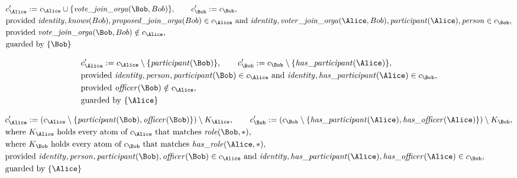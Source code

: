 \begin{align*}
&
c'_
{
\Alice
}
 := 
c_
{
\Alice
}
 \cup 
\{
\mathit{\detokenize{
vote_join_orga
}}
(
\Bob
,
Bob
)
\}
, \qquad 
c'_
{
\Bob
}
 := 
c_
{
\Bob
}
,\\
&
\text{provided } 
\mathit{\detokenize{
identity
}}
,
\mathit{\detokenize{
knows
}}
(
Bob
)
,
\mathit{\detokenize{
proposed_join_orga
}}
(
Bob
)
 \in c_
{
\Alice
}
 \text{ and } 
\mathit{\detokenize{
identity
}}
,
\mathit{\detokenize{
voter_join_orga
}}
(
\Alice
,
Bob
)
,
\mathit{\detokenize{
participant
}}
(
\Alice
)
,
\mathit{\detokenize{
person
}}
 \in c_
{
\Bob
}
,\\
&
\text{provided } 
\mathit{\detokenize{
vote_join_orga
}}
(
\Bob
,
Bob
)
 \notin c_
{
\Alice
}
,\\
&
\text{guarded by } \{
\Bob
\}
\end{align*}

\begin{align*}
&
c'_
{
\Alice
}
 := 
c_
{
\Alice
}
 \setminus 
\{
\mathit{\detokenize{
participant
}}
(
\Bob
)
\}
, \qquad 
c'_
{
\Bob
}
 := 
c_
{
\Bob
}
 \setminus 
\{
\mathit{\detokenize{
has_participant
}}
(
\Alice
)
\}
,\\
&
\text{provided } 
\mathit{\detokenize{
identity
}}
,
\mathit{\detokenize{
person
}}
,
\mathit{\detokenize{
participant
}}
(
\Bob
)
 \in c_
{
\Alice
}
 \text{ and } 
\mathit{\detokenize{
identity
}}
,
\mathit{\detokenize{
has_participant
}}
(
\Alice
)
 \in c_
{
\Bob
}
,\\
&
\text{provided } 
\mathit{\detokenize{
officer
}}
(
\Bob
)
 \notin c_
{
\Alice
}
,\\
&
\text{guarded by } \{
\Alice
\}
\end{align*}

\begin{align*}
&
c'_
{
\Alice
}
 := 
(c_
{
\Alice
}
 \setminus 
\{
\mathit{\detokenize{
participant
}}
(
\Bob
)
,
\mathit{\detokenize{
officer
}}
(
\Bob
)
\}
) \setminus K_
{
\Alice
}
, \qquad 
c'_
{
\Bob
}
 := 
(c_
{
\Bob
}
 \setminus 
\{
\mathit{\detokenize{
has_participant
}}
(
\Alice
)
,
\mathit{\detokenize{
has_officer
}}
(
\Alice
)
\}
) \setminus K_
{
\Bob
}
,\\
&
\text{where } K_
{
\Alice
}
 \text{ holds every atom of } c_
{
\Alice
}
 \text{ that matches } 
\mathit{\detokenize{
role
}}
(
\Bob
,
\ast
)
,\\
&
\text{where } K_
{
\Bob
}
 \text{ holds every atom of } c_
{
\Bob
}
 \text{ that matches } 
\mathit{\detokenize{
has_role
}}
(
\Alice
,
\ast
)
,\\
&
\text{provided } 
\mathit{\detokenize{
identity
}}
,
\mathit{\detokenize{
person
}}
,
\mathit{\detokenize{
participant
}}
(
\Bob
)
,
\mathit{\detokenize{
officer
}}
(
\Bob
)
 \in c_
{
\Alice
}
 \text{ and } 
\mathit{\detokenize{
identity
}}
,
\mathit{\detokenize{
has_participant
}}
(
\Alice
)
,
\mathit{\detokenize{
has_officer
}}
(
\Alice
)
 \in c_
{
\Bob
}
,\\
&
\text{guarded by } \{
\Alice
\}
\end{align*}
